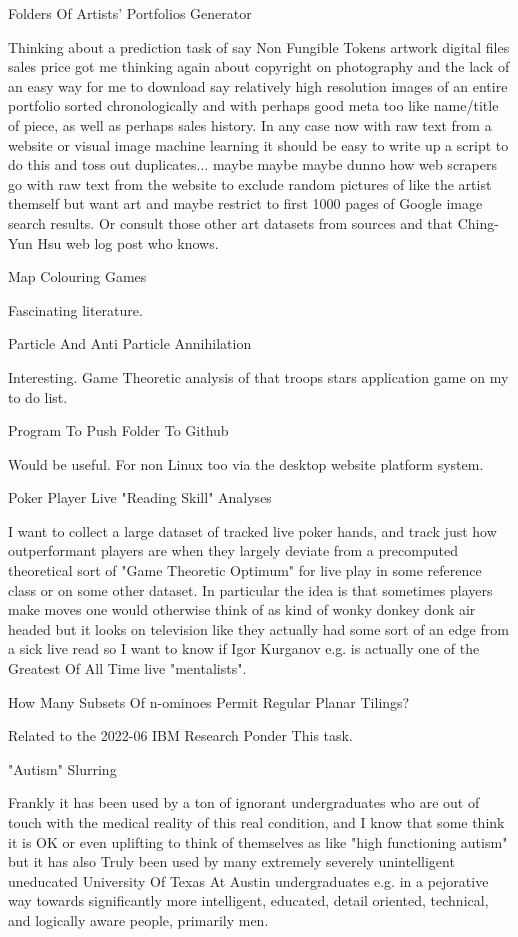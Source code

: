	Folders Of Artists' Portfolios Generator

Thinking about a prediction task of say Non Fungible Tokens artwork digital files sales price got me thinking again about copyright on photography and the lack of an easy way for me to download say relatively high resolution images of an entire portfolio sorted chronologically and with perhaps good meta too like name/title of piece, as well as perhaps sales history. In any case now with raw text from a website or visual image machine learning it should be easy to write up a script to do this and toss out duplicates... maybe maybe maybe dunno how web scrapers go with raw text from the website to exclude random pictures of like the artist themself but want art and maybe restrict to first 1000 pages of Google image search results. Or consult those other art datasets from sources and that Ching-Yun Hsu web log post who knows.

	Map Colouring Games

Fascinating literature.

	Particle And Anti Particle Annihilation

Interesting. Game Theoretic analysis of that troops stars application game on my to do list.

	Program To Push Folder To Github

Would be useful. For non Linux too via the desktop website platform system.

	Poker Player Live "Reading Skill" Analyses

I want to collect a large dataset of tracked live poker hands, and track just how outperformant players are when they largely deviate from a precomputed theoretical sort of "Game Theoretic Optimum" for live play in some reference class or on some other dataset. In particular the idea is that sometimes players make moves one would otherwise think of as kind of wonky donkey donk air headed but it looks on television like they actually had some sort of an edge from a sick live read so I want to know if Igor Kurganov e.g. is actually one of the Greatest Of All Time live "mentalists".

	How Many Subsets Of n-ominoes Permit Regular Planar Tilings?

Related to the 2022-06 IBM Research Ponder This task.

	"Autism" Slurring

Frankly it has been used by a ton of ignorant undergraduates who are out of touch with the medical reality of this real condition, and I know that some think it is OK or even uplifting to think of themselves as like "high functioning autism" but it has also Truly been used by many extremely severely unintelligent uneducated University Of Texas At Austin undergraduates e.g. in a pejorative way towards significantly more intelligent, educated, detail oriented, technical, and logically aware people, primarily men.

